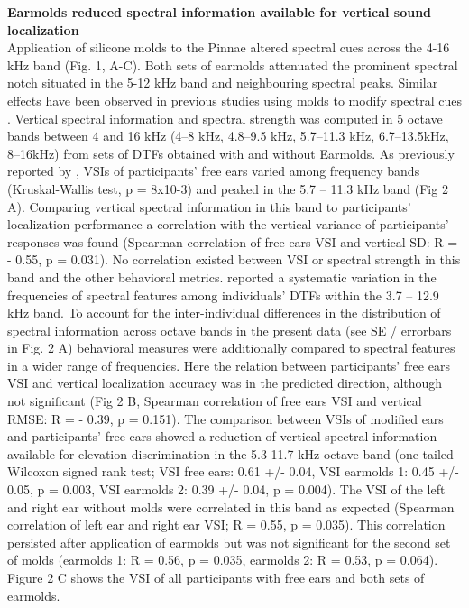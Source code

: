 
\noindent \textbf{Earmolds reduced spectral information available for vertical sound localization}\\
Application of silicone molds to the Pinnae altered spectral cues across the 4-16 kHz band (Fig. 1, A-C). Both sets of earmolds attenuated the prominent spectral notch situated in the 5-12 kHz band and neighbouring spectral peaks. Similar effects have been observed in previous studies using molds to modify spectral cues \citep{trapeau_fast_2016}\citep{wanrooij_relearning_2005}\citep{hofman_relearning_1998}. Vertical spectral information and spectral strength was computed in 5 octave bands between 4 and 16 kHz (4–8 kHz, 4.8–9.5 kHz, 5.7–11.3 kHz, 6.7–13.5kHz, 8–16kHz) from sets of DTFs obtained with and without Earmolds. As previously reported by \citet{trapeau_fast_2016}, VSIs of participants’ free ears varied among frequency bands (Kruskal-Wallis test, p = 8x10-3) and peaked in the 5.7 – 11.3 kHz band (Fig 2 A). Comparing vertical spectral information in this band to participants' localization performance a correlation with the vertical variance of participants' responses was found (Spearman correlation of free ears VSI and vertical SD: R = - 0.55, p = 0.031). No correlation existed between VSI or spectral strength  in this band and the other behavioral metrics. \citet{middlebrooks_individual_1999} reported a systematic variation in the frequencies of spectral features among individuals’ DTFs within the 3.7 – 12.9 kHz band. To account for the inter-individual differences in the distribution of spectral information across octave bands in the present data (see SE / errorbars in Fig. 2 A) behavioral measures were additionally compared to spectral features in a wider range of frequencies. Here the relation between participants’ free ears VSI and vertical localization accuracy was in the predicted direction, although not significant (Fig 2 B, Spearman correlation of free ears VSI and vertical RMSE: R = - 0.39, p = 0.151). The comparison between VSIs of modified ears and participants’ free ears showed a reduction of vertical spectral information available for elevation discrimination in the 5.3-11.7 kHz octave band (one-tailed Wilcoxon signed rank test; VSI free ears: 0.61 +/- 0.04, VSI earmolds 1: 0.45 +/- 0.05, p = 0.003, VSI earmolds 2: 0.39 +/- 0.04, p = 0.004). The VSI of the left and right ear without molds were correlated in this band as expected (Spearman correlation of left ear and right ear VSI; R = 0.55, p = 0.035). This correlation persisted after application of earmolds  but was not significant for the second set of molds (earmolds 1: R = 0.56, p = 0.035, earmolds 2: R = 0.53, p = 0.064). Figure 2 C shows the VSI of all participants with free ears and both sets of earmolds.\\

